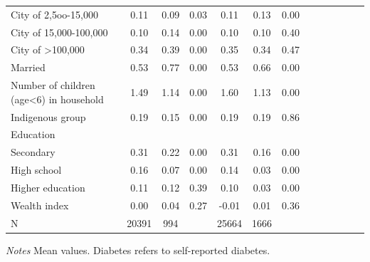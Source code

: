 \documentclass[12pt,english]{article}
\begin{document}
\begin{table}[!ht]
\begin{adjustbox}{max width=\linewidth, center}
\begin{threeparttable}
{\begin{tabular}{l*{6}{S S}}
					City of 2,5oo-15,000&        0.11&        0.09&        0.03&        0.11&        0.13&        0.00\\
					City of 15,000-100,000&        0.10&        0.14&        0.00&        0.10&        0.10&        0.40\\
					City of >100,000    &        0.34&        0.39&        0.00&        0.35&        0.34&        0.47\\
					Married             &        0.53&        0.77&        0.00&        0.53&        0.66&        0.00\\
					Number of children (age<6) in household&        1.49&        1.14&        0.00&        1.60&        1.13&        0.00\\
					Indigenous group    &        0.19&        0.15&        0.00&        0.19&        0.19&        0.86\\
					Education &&&&&& \\                    
					\hspace*{10mm}Secondary           &        0.31&        0.22&        0.00&        0.31&        0.16&        0.00\\
					\hspace*{10mm}High school         & 0.16&        0.07&        0.00&        0.14&        0.03&        0.00\\
					\hspace*{10mm}Higher education    & 0.11&        0.12&        0.39&        0.10&        0.03&        0.00\\
					Wealth index        &        0.00&        0.04&        0.27&       -0.01&        0.01&        0.36\\
					N &20391&994&&25664&1666&\\
					\bottomrule
				\end{tabular}
				\begin{tablenotes}
					\item \footnotesize \textit{Notes} Mean values. Diabetes refers to self-reported diabetes.
				\end{tablenotes}
			}
		\end{threeparttable}
	\end{adjustbox}
\end{table}
\end{document}
